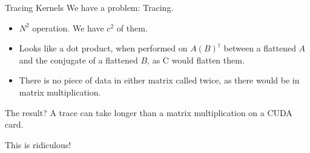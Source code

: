 \documentclass[xcolor=svgnames]{beamer}
\begin{document}
\begin{frame}{Tracing Kernels}
 We have a problem: Tracing.
 
 \begin{itemize}
  \item $N^2$ operation. We have $c^2$ of them.
  \item Looks like a dot product, when performed on $A(B)^\dagger$ between a flattened $A$ and the conjugate of a flattened $B$, as C would flatten them.
  \item There is no piece of data in either matrix called twice, as there would be in matrix multiplication.
 \end{itemize}
 
 The result? A trace can take longer than a matrix multiplication on a CUDA card.
 
 \vspace{1em}
 
 This is ridiculous!
\end{frame}

\end{document}
